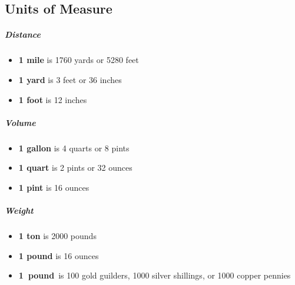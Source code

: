 \documentclass[itdr]{subfiles}
\begin{document}
\begin{dbox}
	\subsection*{Units of Measure}
	
	\subparagraph{Distance}
	\begin{itemize}
		\item \textbf{1 mile} is 1760 yards or 5280 feet
		\item \textbf{1 yard} is 3 feet or 36 inches
		\item \textbf{1 foot} is 12 inches
	\end{itemize}

	\subparagraph{Volume}
	\begin{itemize}
		\item \textbf{1 gallon} is 4 quarts or 8 pints
		\item \textbf{1 quart} is 2 pints or 32 ounces
		\item \textbf{1 pint} is 16 ounces
	\end{itemize}
	
	\subparagraph{Weight}
	\begin{itemize}
		\item \textbf{1 ton} is 2000 pounds
		\item \textbf{1 pound} is 16 ounces
		\item \mbox{\textbf{1 pound} is} 100 gold guilders, 1000 silver shillings, or 1000 copper pennies
	\end{itemize}
\end{dbox}

\break
\end{document}
